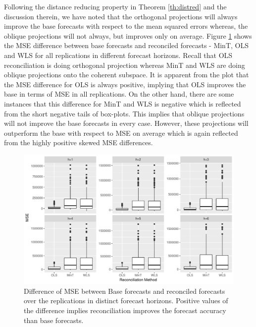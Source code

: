 \documentclass[12pt]{article}
\theoremstyle{definition}
\theoremstyle{property}
\begin{document}
	
	Following the distance reducing property in Theorem \ref{th:distred} and the discussion therein, we have noted that the orthogonal projections will always improve the base forecasts with respect to the mean squared errors whereas, the oblique projections will not always, but improves only on average. Figure \ref{fig:BaseVSRecon_Fc} shows the MSE difference between base forecasts and reconciled forecasts - MinT, OLS and WLS for all replications in different forecast horizons. Recall that OLS reconciliation is doing orthogonal projection whereas MinT and WLS are doing oblique projections onto the coherent subspace. It is apparent from the plot that the MSE difference for OLS is always positive, implying that OLS improves the base in terms of MSE in all replications. On the other hand,  there are some instances that this difference for MinT and WLS is negative which is reflected from the short negative tails of box-plots. This implies that oblique projections will not improve the base forecasts in every case. However, these projections will outperform the base with respect to MSE on average which is again reflected from the highly positive skewed MSE differences.  
	
	
	 \begin{figure}[H]
		\centering
		\small
		\includegraphics[width = \textwidth]{Empirical-results/Final-results/Base-Recon.pdf}
		\caption{Difference of MSE between Base forecasts and reconciled forecasts over the replications in distinct forecast horizons. Positive values of the difference implies reconciliation improves the forecast accuracy than base forecasts.}\label{fig:BaseVSRecon_Fc}
	\end{figure}
	
	
	
	
	
\end{document}
